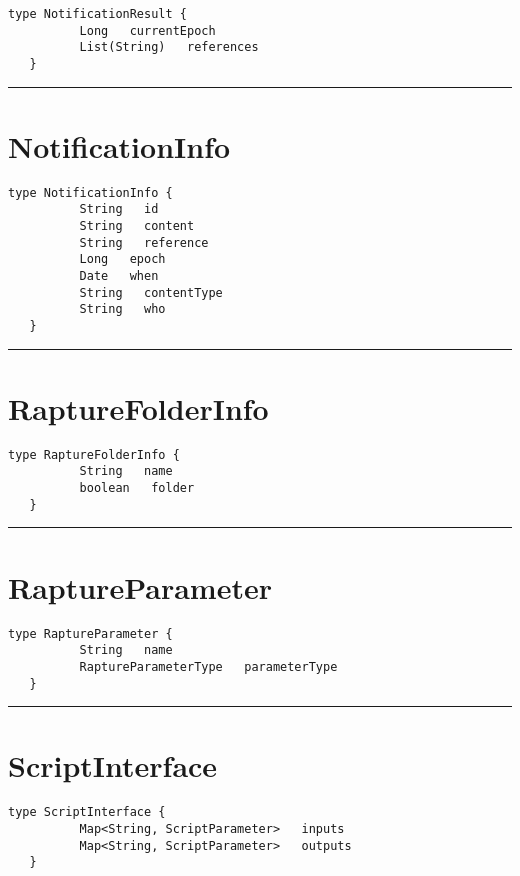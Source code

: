 \begin{lstlisting}[style=nonumbers]
   type NotificationResult {
          Long   currentEpoch
          List(String)   references
   }
\end{lstlisting}

\rule{12cm}{2pt}
\section{NotificationInfo}
\label{type:NotificationInfo}

\begin{lstlisting}[style=nonumbers]
   type NotificationInfo {
          String   id
          String   content
          String   reference
          Long   epoch
          Date   when
          String   contentType
          String   who
   }
\end{lstlisting}

\rule{12cm}{2pt}
\section{RaptureFolderInfo}
\label{type:RaptureFolderInfo}

\begin{lstlisting}[style=nonumbers]
   type RaptureFolderInfo {
          String   name
          boolean   folder
   }
\end{lstlisting}

\rule{12cm}{2pt}
\section{RaptureParameter}
\label{type:RaptureParameter}

\begin{lstlisting}[style=nonumbers]
   type RaptureParameter {
          String   name
          RaptureParameterType   parameterType
   }
\end{lstlisting}

\rule{12cm}{2pt}
\section{ScriptInterface}
\label{type:ScriptInterface}

\begin{lstlisting}[style=nonumbers]
   type ScriptInterface {
          Map<String, ScriptParameter>   inputs
          Map<String, ScriptParameter>   outputs
   }
\end{lstlisting}

